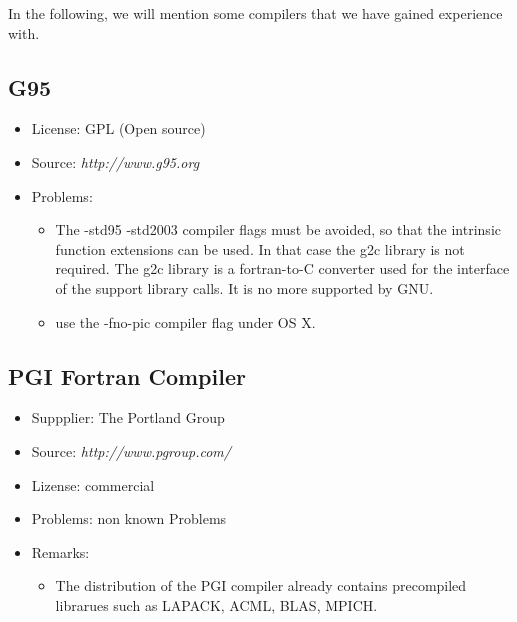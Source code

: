 \documentclass[a4paper,10pt]{report}
\begin{document}
In the following, we will mention some compilers that we have gained
experience with.
 
\subsection{G95}
\label{sec:g95}
\begin{itemize}
\item License: GPL (Open source)
\item Source: \textit{http://www.g95.org}
\item Problems: 
\begin{itemize}
\item The -std95 -std2003 compiler flags must be avoided, so that the
intrinsic function extensions can be used. In that case the g2c
library is not required. The g2c library is a fortran-to-C converter 
used for the interface of the support library calls. It is no more 
supported by GNU.
\item use the -fno-pic compiler flag under OS X.
\end{itemize}
\end{itemize}

\subsection{PGI Fortran Compiler}
\begin{itemize}
\item Suppplier: The Portland Group
\item Source: \textit{http://www.pgroup.com/}
\item Lizense: commercial
\item Problems: non known Problems
\item Remarks:
\begin{itemize}
\item The distribution of the PGI compiler already contains
precompiled librarues such as LAPACK, ACML, BLAS, MPICH.
\end{itemize}
\end{itemize}

\end{document}
